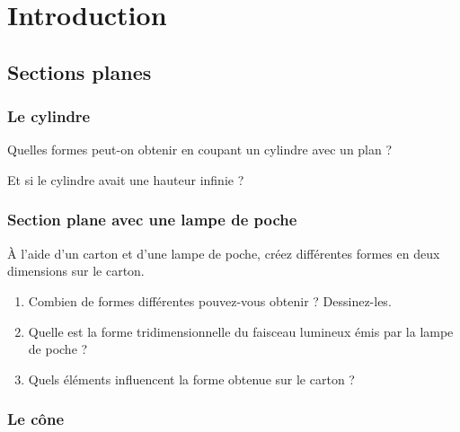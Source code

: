 \newpage
\section{Introduction}
\subsection{Sections planes}
\subsubsection{Le cylindre}

Quelles formes peut-on obtenir en coupant un cylindre avec un plan ?

\vspace{1cm}



Et si le cylindre avait une hauteur infinie ?

\subsubsection{Section plane avec une lampe de poche}

À l’aide d’un carton et d’une lampe de poche, créez différentes formes en deux dimensions sur le carton.
\begin{enumerate}
    \item Combien de formes différentes pouvez-vous obtenir ? Dessinez-les.
    \item Quelle est la forme tridimensionnelle du faisceau lumineux émis par la lampe de poche ?
    \item Quels éléments influencent la forme obtenue sur le carton ?
\end{enumerate}

\newpage
\subsubsection{Le cône}\label{section:coneplan}

